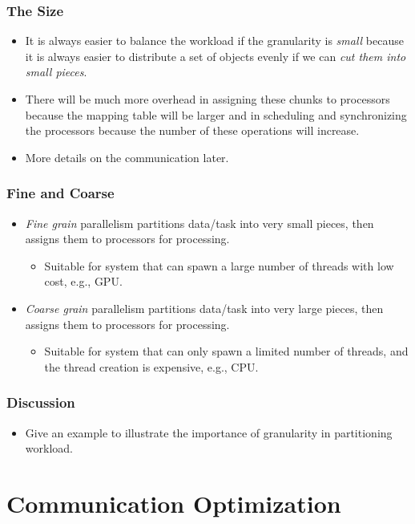 \documentclass{beamer}
\begin{document}
\begin{CJK}{UTF8}{bsmi}
\begin{frame}
\frametitle{The Size}
\begin{itemize}
\item It is always easier to balance the workload if the granularity is {\em small} because it is always easier to distribute a set of objects evenly if we can {\em cut them into small pieces}.
\item There will be much more overhead in assigning these chunks to processors because the mapping table will be larger and in scheduling and synchronizing the processors because the number of these operations will increase.  
\item More details on the communication later.
\end{itemize}
\end{frame}

\begin{frame}
\frametitle{Fine and Coarse}
\begin{itemize}
\item {\em Fine grain} parallelism partitions data/task into very small pieces, then assigns them to processors for processing.
\begin{itemize}
\item Suitable for system that can spawn a large number of threads with low cost, e.g., GPU.
\end{itemize}
\item {\em Coarse grain} parallelism partitions data/task into very large pieces, then assigns them to processors for processing.
\begin{itemize}
\item Suitable for system that can only spawn a limited number of threads, and the thread creation is expensive, e.g., CPU.
\end{itemize}
\end{itemize}
\end{frame}

\begin{frame}
\frametitle{Discussion}
\begin{itemize}
\item Give an example to illustrate the importance of granularity in
  partitioning workload.
\end{itemize}
\end{frame}

\section{Communication Optimization}


\end{CJK}
\end{document}
